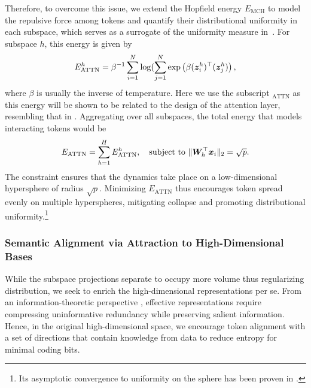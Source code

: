 Therefore, to overcome this issue, we extend the Hopfield energy $E_\text{MCH}$ to model the repulsive force among tokens and quantify their distributional uniformity in each subspace, which serves as a surrogate of the uniformity measure in~. For subspace $h$, this energy is given by
\begin{equation}
\label{eq:2}
    E_{\text{ATTN}}^h = \beta^{-1}\sum_{i=1}^N\log(\sum_{j=1}^N \exp\left(\beta({\bm{z}}_i^h)^\top({\bm{z}}_j^h)\right),
\end{equation}
where $\beta$ is usually the inverse of temperature. Here we use the subscript $_\mathrm{ATTN}$ as this energy will be shown to be related to the design of the attention layer, resembling that in \citet{yu2023white}. Aggregating over all subspaces, the total energy that models interacting tokens would be 
\begin{equation}
\label{eq:3}
        E_{\text{ATTN}} = \sum_{h=1}^H E_{\text{ATTN}}^h, \quad\text{subject to} ~\|{\bm{W}}_h^\top{\bm{x}}_i\|_2 = \sqrt{p}. 
\end{equation}
The constraint ensures that the dynamics take place on a low-dimensional hypersphere of radius $\sqrt{p}$. Minimizing $E_{\text{ATTN}}$ thus encourages token spread evenly on multiple hyperspheres, mitigating collapse and promoting distributional uniformity.\footnote{Its asymptotic convergence to uniformity on the sphere has been proven in \citet{liu2018learning}.}


\subsubsection{Semantic Alignment via Attraction to High-Dimensional Bases}
While the subspace projections separate to occupy more volume thus regularizing distribution, we seek to enrich the high-dimensional representations per se. From an information-theoretic perspective \citep{tishby2000information, tishby2015deep}, effective representations require compressing uninformative redundancy while preserving salient information. Hence, in the original high-dimensional space, we encourage token alignment with a set of directions that contain knowledge from data to reduce entropy for minimal coding bits.

